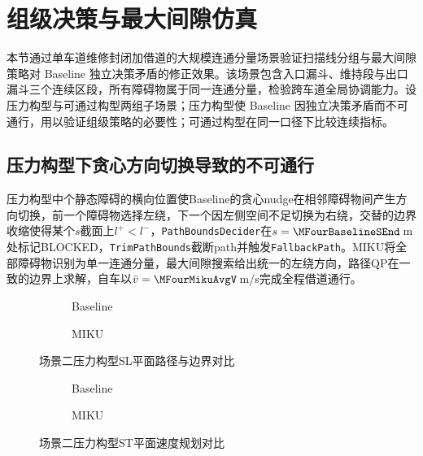 \section{组级决策与最大间隙仿真}
\label{sec:exp_ch6}

本节通过单车道维修封闭加借道的大规模连通分量场景验证扫描线分组与最大间隙策略对 Baseline 独立决策矛盾的修正效果。该场景包含入口漏斗、维持段与出口漏斗三个连续区段，所有障碍物属于同一连通分量，检验跨车道全局协调能力。设压力构型与可通过构型两组子场景；压力构型使 Baseline 因独立决策矛盾而不可通行，用以验证组级策略的必要性；可通过构型在同一口径下比较连续指标。

\subsection{压力构型下贪心方向切换导致的不可通行}

压力构型中\DenseConstructionTotalObstacles{}个静态障碍的横向位置使Baseline的贪心nudge在相邻障碍物间产生方向切换，前一个障碍物选择左绕，下一个因左侧空间不足切换为右绕，交替的边界收缩使得某个$s$截面上$l^+<l^-$，\texttt{PathBoundsDecider}在$s=\MFourBaselineSEnd$\,m处标记BLOCKED，\texttt{TrimPathBounds}截断path并触发\texttt{FallbackPath}。MIKU将全部障碍物识别为单一连通分量，最大间隙搜索给出统一的左绕方向，路径QP在一致的边界上求解，自车以$\bar{v}=\MFourMikuAvgV$\,m/s完成全程借道通行。

\begin{figure}[H]
\centering
\begin{subfigure}[b]{\textwidth}
  \centering
  
  \caption{Baseline}
  \label{fig:exp_ch6_pressure_sl_4:a}
\end{subfigure}

\begin{subfigure}[b]{\textwidth}
  \centering
  
  \caption{MIKU}
  \label{fig:exp_ch6_pressure_sl_4:b}
\end{subfigure}
\caption{场景二压力构型SL平面路径与边界对比}
\label{fig:exp_ch6_pressure_sl_4}
\end{figure}

\begin{figure}[H]
\centering
\begin{subfigure}[b]{0.48\textwidth}
  \centering
  
  \caption{Baseline}
  \label{fig:exp_ch6_pressure_st_4:a}
\end{subfigure}\hfill
\begin{subfigure}[b]{0.48\textwidth}
  \centering
  
  \caption{MIKU}
  \label{fig:exp_ch6_pressure_st_4:b}
\end{subfigure}
\caption{场景二压力构型ST平面速度规划对比}
\label{fig:exp_ch6_pressure_st_4}
\end{figure}

